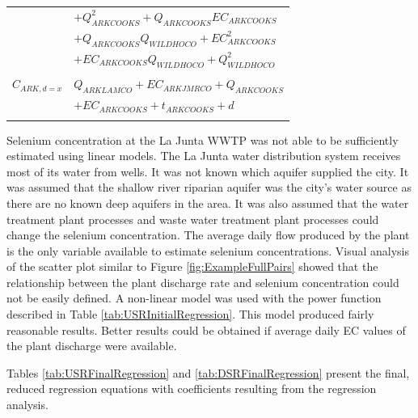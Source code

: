 \begin{linenumbers}
\begin{table}[htbp]
\begin{tabular}{c l}
					& $+ Q_{ARKCOOKS}^2+ Q_{ARKCOOKS} EC_{ARKCOOKS} $\\
					& $+ Q_{ARKCOOKS} Q_{WILDHOCO}+ EC_{ARKCOOKS}^2 $\\
					& $+ EC_{ARKCOOKS} Q_{WILDHOCO}+ Q_{WILDHOCO}^2$\\
	\\
	$ C_{ARK,d=x} $	& $Q_{ARKLAMCO} + EC_{ARKJMRCO} + Q_{ARKCOOKS}$ \\
					& $+ EC_{ARKCOOKS} + t_{ARKCOOKS} + d$\\
	\bottomrule \\
\end{tabular}
\end{table}

Selenium concentration at the La Junta WWTP was not able to be sufficiently estimated using linear models.  The La Junta water distribution system receives most of its water from wells.  It was not known which aquifer supplied the city.  It was assumed that the shallow river riparian aquifer was the city's water source as there are no known deep aquifers in the area.  It was also assumed that the water treatment plant processes and waste water treatment plant processes could change the selenium concentration.  The average daily flow produced by the plant is the only variable available to estimate selenium concentrations.  Visual analysis of the scatter plot similar to Figure \ref{fig:ExampleFullPairs} showed that the relationship between the plant discharge rate and selenium concentration could not be easily defined.  A non-linear model was used with the power function described in Table \ref{tab:USRInitialRegression}.  This model produced fairly reasonable results.  Better results could be obtained if average daily EC values of the plant discharge were available.

Tables \ref{tab:USRFinalRegression} and \ref{tab:DSRFinalRegression} present the final, reduced regression equations with coefficients resulting from the regression analysis.


\end{linenumbers}
